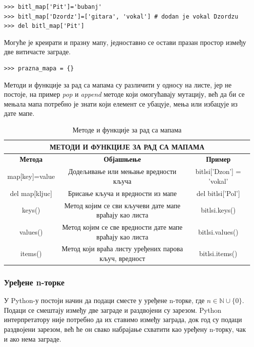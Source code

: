 \begin{lstlisting}[caption = Мутација мапа, label = mutacija_mapa]
>>> bitl_map['Pit']='bubanj'
>>> bitl_map['Dzordz']=['gitara', 'vokal'] # dodan je vokal Dzordzu
>>> del bitl_map['Pit']
\end{lstlisting}

Могуће је креирати и празну мапу, једноставно се остави празан простор између две витичасте заграде.

\begin{lstlisting}[caption = Креирање празне мапе, label=prazna_mapa]
>>> prazna_mapa = {}
\end{lstlisting}

Методи и функције за рад са мапама су различити у односу на листе, јер не постоје, на пример \emph{pop} и \emph{append} методе који омогућавају мутацију, већ да би се мењала мапа потребно је знати који елемент се убацује, мења или избацује из дате мапе.

\begin{table}[here]
\centering
\begin{tabular}{|c|c|c|} \hline
\multicolumn{3}{|c|}{\textbf{МЕТОДИ И ФУНКЦИЈЕ ЗА РАД СА МАПАМА}} \\ \hline
\textbf{Метода} & \textbf{Објашњење} & \textbf{Пример} \\ \hline
map[key]=value & Додељивање или мењање вредности кључа & bitlsi['Dzon'] = 'vokal' \\ \hline
del map[kljuc] & Брисање кључа и вредности из мапе & del bitlsi['Pol'] \\ \hline
keys() & Метод којим се сви кључеви дате мапе враћају као листа & bitlsi.keys() \\ \hline
values() & Метод којим се све вредности дате мапе враћају као листа & bitlsi.values() \\ \hline
items() & Метод који враћа листу уређених парова кључ, вредност & bitlsi.items() \\ \hline
\end{tabular}
\caption{Методе и функције за рад са мапама}
\label{tabela:mape}
\end{table}

\subsubsection{Уређене n-торке}

У Python-у постоји начин да подаци сместе у уређене n-торке, где $n \in \mathbb{N}\cup\{0\}$. Подаци се смештају између две заграде и раздвојени су зарезом. Python интерпретатору није потребно да их ставимо између заграда, док год су подаци раздвојени зарезом, већ ће он свако набрајање схватити као уређену n-торку, чак и ако нема заграде.

